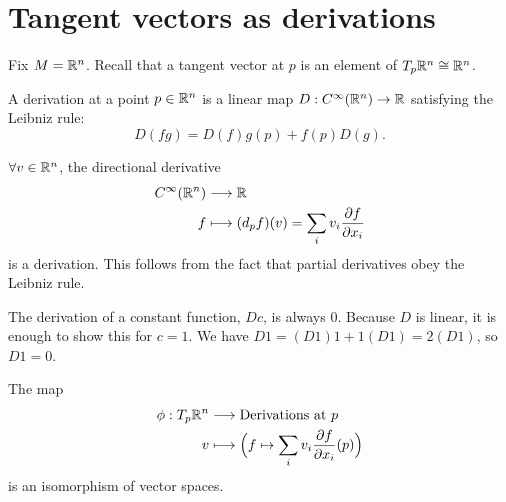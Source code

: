 



\section{Tangent vectors as derivations}\label{sec:tangvectder}

 

Fix $M = \mathbb{R}^n$.
Recall that a tangent vector at $p$ is an element of $T_p \mathbb{R}^n \cong \mathbb{R}^n$.
\begin{definition}[Derivation]
    A derivation at a point $p \in \mathbb{R}^{n}$ is a linear map $D:C^{\infty}(\mathbb{R}^n) \to  \mathbb{R}$ satisfying the Leibniz rule:
    \[
        D(fg) = D(f) g(p) + f(p) D(g)
    .\] 
\end{definition}
\clearpage
\begin{eg}
    $\forall v \in \mathbb{R}^n$, the directional derivative 
    \begin{align*}
        C^{\infty}(\mathbb{R}^n) &\longrightarrow \mathbb{R} \\
        f &\longmapsto (d_p f)(v) = \sum_i v_{i} \frac{\partial f}{\partial x_i} 
    \end{align*}
    is a derivation. This follows from the fact that partial derivatives obey the Leibniz rule.
\end{eg}
\begin{remark}
    The derivation of a constant function, $Dc$, is always $0$.
    Because $D$ is linear, it is enough to show this for $c = 1$.
    We have $D 1 = (D 1 ) 1 + 1 ( D 1) = 2 ( D 1)$, so $D 1 = 0$.
\end{remark}
\begin{prop}
    The map
    \begin{align*}
        \phi: T_p \mathbb{R}^n &\longrightarrow \text{Derivations at $p$} \\
        v &\longmapsto  \Big( f \mapsto \sum_i v_{i} \frac{\partial f}{\partial x_i}(p) \Big)
    \end{align*}
    is an isomorphism of vector spaces.
\end{prop}
